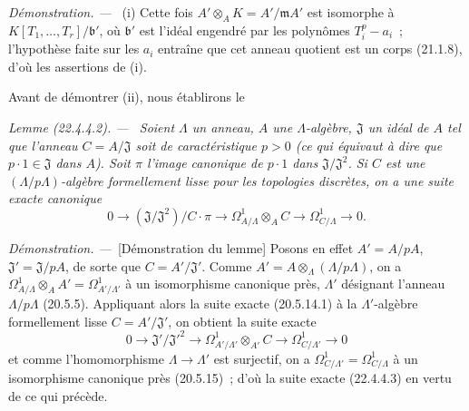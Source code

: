\documentclass[10pt,oneside]{book}
\makeatletter
\newcommand{\setmanualcurrentlabel}[1]{\def\@currentlabel{#1}}
\newenvironment{lemma}[1][]{%
  \setmanualcurrentlabel{#1}\par\medskip\noindent\itshape Lemme (#1). ---\ }{\par}
\newenvironment{proof}{%
  \par\medskip\noindent\textit{Démonstration. ---\ }}{\par}
\makeatother
\begin{document}
\begin{proof}
(i) Cette fois $A'\otimes_AK=A'/\mathfrak mA'$ est isomorphe à
$K[T_1,\ldots,T_r]/\mathfrak b'$, où $\mathfrak b'$ est l'idéal engendré
par les polynômes $T_i^p-a_i$~; l'hypothèse faite sur les $a_i$ entraîne que
cet anneau quotient est un corps (21.1.8), d'où les assertions de (i).

Avant de démontrer (ii), nous établirons le

\begin{lemma}[22.4.4.2]
\label{0.22.4.4.2-fr}
Soient $\Lambda$ un anneau, $A$ une $\Lambda$-algèbre, $\mathfrak J$ un
idéal de $A$ tel que l'anneau $C=A/\mathfrak J$ soit de caractéristique
$p>0$ (ce qui équivaut à dire que $p\cdot1\in\mathfrak J$ dans $A$). Soit
$\pi$ l'image canonique de $p\cdot1$ dans
$\mathfrak J/\mathfrak J^2$. Si $C$ est une $(\Lambda/p\Lambda)$-algèbre
formellement lisse pour les topologies discrètes, on a une suite exacte
canonique
\begin{equation}
\label{0.22.4.4.3-fr}
  0\longrightarrow(\mathfrak J/\mathfrak J^2)/C\cdot\pi
  \longrightarrow\Omega^1_{A/\Lambda}\otimes_AC
  \longrightarrow\Omega^1_{C/\Lambda}\longrightarrow0.
  \tag{22.4.4.3}
\end{equation}
\end{lemma}

\begin{proof}[Démonstration du lemme]
Posons en effet $A'=A/pA$, $\mathfrak J'=\mathfrak J/pA$, de sorte que
$C=A'/\mathfrak J'$. Comme
$A'=A\otimes_\Lambda(\Lambda/p\Lambda)$, on a
$\Omega^1_{A/\Lambda}\otimes_AA'=\Omega^1_{A'/\Lambda'}$ à un
isomorphisme canonique près, $\Lambda'$ désignant l'anneau
$\Lambda/p\Lambda$ (20.5.5). Appliquant alors la suite exacte (20.5.14.1) à
la $\Lambda'$-algèbre formellement lisse $C=A'/\mathfrak J'$, on obtient la
suite exacte
\[
  0\longrightarrow\mathfrak J'/\mathfrak J'^2
  \longrightarrow\Omega^1_{A'/\Lambda'}\otimes_{A'}C
  \longrightarrow\Omega^1_{C/\Lambda'}\longrightarrow0
\]
et comme l'homomorphisme $\Lambda\to\Lambda'$ est surjectif, on a
$\Omega^1_{C/\Lambda'}=\Omega^1_{C/\Lambda}$ à un isomorphisme canonique
près (20.5.15)~; d'où la suite exacte (22.4.4.3) en vertu de ce qui précède.
\end{proof}


\end{proof}
\end{document}
